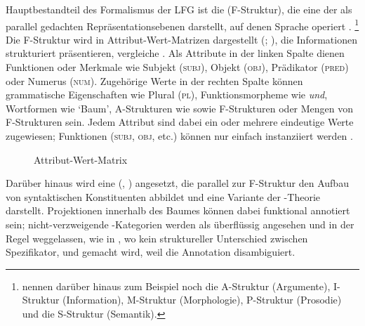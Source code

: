 Hauptbestandteil des Formalismus der LFG ist die 
(F-Struktur), die eine der als parallel gedachten Repräsentationsebenen
darstellt, auf denen Sprache operiert \autocite[840--844]{buttking2015}.%
%
	\footnote{\citet[862--865]{buttking2015} nennen darüber hinaus zum Beispiel
		noch die
		A-Struktur (Argumente),
		I-Struktur (Information),
		M-Struktur (Morphologie),
		P-Struktur (Prosodie)
		und die
		S-Struktur (Semantik).
	}
%
Die F-Struktur wird in
Attribut-Wert-Matrizen dargestellt
(;
\cites[vgl.][44--45]{bresnanetal2016}[207--221]{mueller2023}), die
Informationen strukturiert präsentieren, vergleiche . Als
Attribute in der linken Spalte dienen Funktionen oder
Merkmale wie Subjekt (\textsc{subj}), Objekt
(\textsc{obj}), Prädikator (\textsc{pred}) oder Numerus (\textsc{num}).
Zugehörige Werte in der rechten Spalte können grammatische Eigenschaften wie
Plural (\textsc{pl}), Funktionsmorpheme wie \textit{und}, Wortformen wie
`Baum', A-Strukturen wie  sowie F-Strukturen oder Mengen von
F-Struk\-turen sein. Jedem Attribut sind
dabei ein oder mehrere eindeutige Werte zugewiesen; Funktionen (\textsc{subj},
\textsc{obj}, etc.) können nur einfach instanziiert werden
\autocite[vgl.][44--58]{bresnanetal2016}.

\begin{figure}
\centering
	{%
	}
\caption{Attribut-Wert-Matrix \autocite[nach][209]{mueller2023}}
\label{fig:avm}
\end{figure}

Darüber hinaus wird eine  (, ) angesetzt, die parallel zur
F-Struktur den Aufbau von syntaktischen Konstituenten
abbildet und eine Variante der -Theorie
\autocites{chomsky1970,jackendoff1977} darstellt. Projektionen innerhalb des
Baumes können dabei funktional annotiert sein; nicht-verzweigende
-Kategorien werden als überflüssig angesehen und in der Regel
weggelassen, wie in , wo kein struktureller Unterschied
zwischen Spezifikator,  und  gemacht wird, weil
die Annotation disambiguiert.

